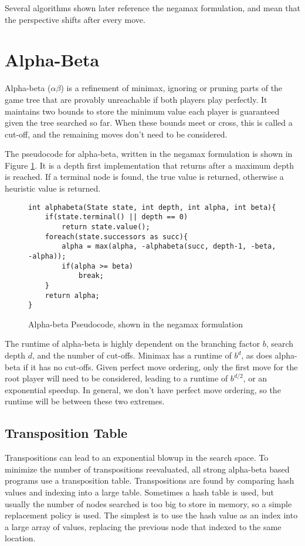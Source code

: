 Several algorithms shown later reference the negamax formulation, and mean that the perspective shifts after every move.


\section{Alpha-Beta}\label{sec:alphabeta}

Alpha-beta ($\alpha\beta$) is a refinement of minimax, ignoring or pruning parts of the game tree that are provably unreachable if both players play perfectly. It maintains two bounds to store the minimum value each player is guaranteed given the tree searched so far. When these bounds meet or cross, this is called a cut-off, and the remaining moves don't need to be considered. 

The pseudocode for alpha-beta, written in the negamax formulation is shown in Figure \ref{fig:abcode}. It is a depth first implementation that returns after a maximum depth is reached. If a terminal node is found, the true value is returned, otherwise a heuristic value is returned.

\begin{figure}

\begin{lstlisting}
int alphabeta(State state, int depth, int alpha, int beta){
	if(state.terminal() || depth == 0)
		return state.value();
	foreach(state.successors as succ){
		alpha = max(alpha, -alphabeta(succ, depth-1, -beta, -alpha));
		if(alpha >= beta)
			break;
	}
	return alpha;
}
\end{lstlisting}

\caption{Alpha-beta Pseudocode, shown in the negamax formulation}
\label{fig:abcode}
\end{figure}

The runtime of alpha-beta is highly dependent on the branching factor $b$, search depth $d$, and the number of cut-offs. Minimax has a runtime of $b^d$, as does alpha-beta if it has no cut-offs. Given perfect move ordering, only the first move for the root player will need to be considered, leading to a runtime of $b^{d/2}$, or an exponential speedup. In general, we don't have perfect move ordering, so the runtime will be between these two extremes.

\subsection{Transposition Table}

Transpositions can lead to an exponential blowup in the search space. To minimize the number of transpositions reevaluated, all strong alpha-beta based programs use a transposition table. Transpositions are found by comparing hash values and indexing into a large table. Sometimes a hash table is used, but usually the number of nodes searched is too big to store in memory, so a simple replacement policy is used. The simplest is to use the hash value as an index into a large array of values, replacing the previous node that indexed to the same location.

